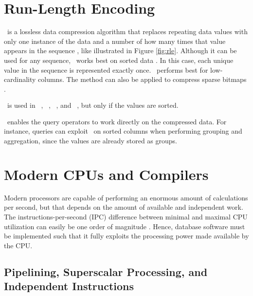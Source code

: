 \section{Run-Length Encoding}
\label{sec:Run-Length Encoding}

\rle~is a lossless data compression algorithm that replaces repeating data values with only one instance of the data and a number of how many times that value appears in the sequence \cite{Stoimen_undated-js}, like illustrated in Figure \ref{fig:rle}. Although it can be used for any sequence, \rle~works best on sorted data \cite{Bjorklund2011-wh, Holloway2008-rr}. In this case, each unique value in the sequence is represented exactly once. \rle~performs best for low-cardinality columns. The method can also be applied to compress sparse bitmaps \cite{Stonebraker2005-qz}.

\rle~is used in \cstore~\cite{Stonebraker2005-qz}, \vertica~\cite{Lamb2012-kg}, \oracle~\cite{Oracle2015-fs}, and \sapnw~\cite{Lemke2010-is}, but only if the values are sorted. 

\rle~enables the query operators to work directly on the compressed data. For instance, queries can exploit \rle~on sorted columns when performing grouping and aggregation, since the values are already stored as groups. 


\section{Modern CPUs and Compilers}
\label{sec:Modern CPUs and Compilers}
Modern processors are capable of performing an enormous amount of calculations per second, but that depends on the amount of available and independent work. The instructions-per-second (IPC) difference between minimal and maximal CPU utilization can easily be one order of magnitude \cite{Boncz2005-wj}. Hence, database software must be implemented such that it fully exploits the processing power made available by the CPU.

\subsection{Pipelining, Superscalar Processing, and Independent Instructions}
\label{sub:Pipelining, Superscalar Processing, and Independent Instructions}

